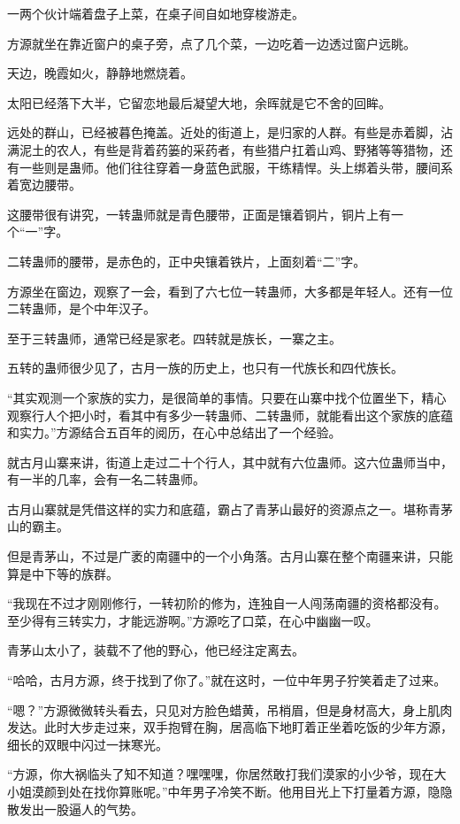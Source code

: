 \begin{this_body}
一两个伙计端着盘子上菜，在桌子间自如地穿梭游走。

方源就坐在靠近窗户的桌子旁，点了几个菜，一边吃着一边透过窗户远眺。

天边，晚霞如火，静静地燃烧着。

太阳已经落下大半，它留恋地最后凝望大地，余晖就是它不舍的回眸。

远处的群山，已经被暮色掩盖。近处的街道上，是归家的人群。有些是赤着脚，沾满泥土的农人，有些是背着药篓的采药者，有些猎户扛着山鸡、野猪等等猎物，还有一些则是蛊师。他们往往穿着一身蓝色武服，干练精悍。头上绑着头带，腰间系着宽边腰带。

这腰带很有讲究，一转蛊师就是青色腰带，正面是镶着铜片，铜片上有一个“一”字。

二转蛊师的腰带，是赤色的，正中央镶着铁片，上面刻着“二”字。

方源坐在窗边，观察了一会，看到了六七位一转蛊师，大多都是年轻人。还有一位二转蛊师，是个中年汉子。

至于三转蛊师，通常已经是家老。四转就是族长，一寨之主。

五转的蛊师很少见了，古月一族的历史上，也只有一代族长和四代族长。

“其实观测一个家族的实力，是很简单的事情。只要在山寨中找个位置坐下，精心观察行人个把小时，看其中有多少一转蛊师、二转蛊师，就能看出这个家族的底蕴和实力。”方源结合五百年的阅历，在心中总结出了一个经验。

就古月山寨来讲，街道上走过二十个行人，其中就有六位蛊师。这六位蛊师当中，有一半的几率，会有一名二转蛊师。

古月山寨就是凭借这样的实力和底蕴，霸占了青茅山最好的资源点之一。堪称青茅山的霸主。

但是青茅山，不过是广袤的南疆中的一个小角落。古月山寨在整个南疆来讲，只能算是中下等的族群。

“我现在不过才刚刚修行，一转初阶的修为，连独自一人闯荡南疆的资格都没有。至少得有三转实力，才能远游啊。”方源吃了口菜，在心中幽幽一叹。

青茅山太小了，装载不了他的野心，他已经注定离去。

“哈哈，古月方源，终于找到了你了。”就在这时，一位中年男子狞笑着走了过来。

“嗯？”方源微微转头看去，只见对方脸色蜡黄，吊梢眉，但是身材高大，身上肌肉发达。此时大步走过来，双手抱臂在胸，居高临下地盯着正坐着吃饭的少年方源，细长的双眼中闪过一抹寒光。

“方源，你大祸临头了知不知道？嘿嘿嘿，你居然敢打我们漠家的小少爷，现在大小姐漠颜到处在找你算账呢。”中年男子冷笑不断。他用目光上下打量着方源，隐隐散发出一股逼人的气势。

\end{this_body}

